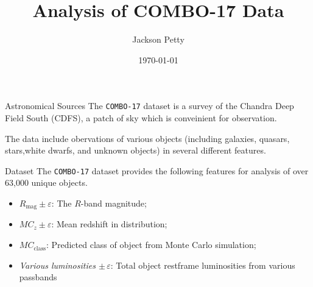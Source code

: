 \documentclass{beamer}
\title{Analysis of COMBO-17 Data}
\author{Jackson Petty}
\date{\today}
\institute{PHYS 356, Yale University}
\newcommand{\combo}{{\texttt{COMBO-17}}}
\begin{document}
	\maketitle

	\begin{frame}{Astronomical Sources}
		The \combo{} dataset is a survey of the Chandra Deep Field South (CDFS), a patch of sky which is conveinient for observation.

		The data include obervations of various objects (including galaxies, quasars, stars,white dwarfs, and unknown objects) in several different features.


	\end{frame}

	\begin{frame}{Dataset}
		The \combo{} dataset provides the following features for analysis of over 63,000 unique objects.
		\begin{itemize}
			\item $R_\text{mag} \pm \varepsilon$: The $R$-band magnitude;
			\item $MC_z \pm \varepsilon$: Mean redshift in distribution;
			\item $MC_\text{class}$: Predicted class of object from Monte Carlo simulation;
			\item \textit{Various luminosities $\pm\,\varepsilon$}: Total object restframe luminosities from various passbands
		\end{itemize}
	\end{frame}
\end{document}
